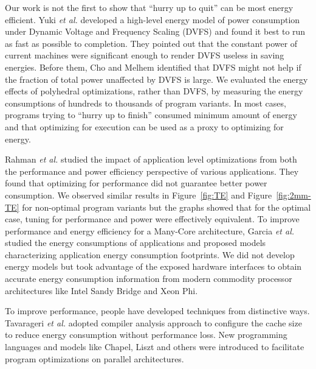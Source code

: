 Our work is not the first to show that ``hurry up to quit'' can be most energy
efficient. Yuki {\it et al.} developed a high-level energy model of power consumption
under Dynamic Voltage and Frequency Scaling (DVFS) and found it best to run
as fast as possible to completion\cite{SpeedEnergy}. They pointed out that the 
constant power of current machines were significant enough to render DVFS useless in saving energies.
Before them, Cho and Melhem\cite{Cho} identified that DVFS might not help if the fraction
of total power unaffected by DVFS is large.
We evaluated the energy effects of polyhedral optimizations, rather than DVFS,
by measuring the energy consumptions of hundreds to thousands of program variants.
In most cases, programs trying to ``hurry up to finish'' consumed minimum
amount of energy and that optimizing for execution can be used as a proxy to optimizing for energy.

Rahman {\it et al.}\cite{CF12} studied the impact of application level optimizations from both the 
performance and power efficiency perspective of various applications. They found
that optimizing for performance did not guarantee better power consumption. We 
observed similar results in Figure~\ref{fig:TE} and Figure~\ref{fig:2mm-TE} for non-optimal
program variants but the graphs showed that for the optimal case, tuning for performance and power were 
effectively equivalent. To improve performance and energy efficiency for a Many-Core architecture,
Garcia {\it et al.}\cite{Garcia} studied the energy consumptions of applications and proposed models 
characterizing application energy consumption footprints. We did not
develop energy models but took advantage of the exposed hardware interfaces to obtain accurate   
energy consumption information from modern commodity processor architectures like
Intel Sandy Bridge and Xeon Phi.

To improve performance, people have 
developed techniques from distinctive ways. Tavarageri {\it et al.}\cite{Reduce-Cache} 
adopted compiler analysis approach to configure the cache size to reduce energy consumption
without performance loss. New programming languages\cite{IPDPS13:LULESH} and 
models like Chapel, Liszt and others were introduced to facilitate program optimizations
on parallel architectures.
